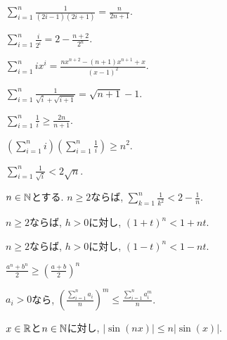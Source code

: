 \begin{prop}
  $\sum_{i=1}^n\frac{1}{(2i-1)(2i+1)}=\frac{n}{2n+1}$.
\end{prop}

\begin{prop}
  $\sum_{i=1}^n\frac{i}{2^i}=2-\frac{n+2}{2^n}$.
\end{prop}

\begin{prop}
  $\sum_{i=1}^n ix^i=\frac{nx^{n+2}-(n+1)x^{n+1}+x}{(x-1)^2}$.
\end{prop}

\begin{prop}
  $\sum_{i=1}^n \frac{1}{\sqrt{i}+\sqrt{i+1}}=\sqrt{n+1}-1$.
\end{prop}

\begin{prop}
$\sum_{i=1}^{n}\frac{1}{i}\geq \frac{2n}{n+1}$.
\end{prop}

\begin{prop}
$\left(\sum_{i=1}^{n}i\right)\left(\sum_{i=1}^{n}\frac{1}{i}\right)\geq n^2$.
\end{prop}

\begin{prop}
$\sum_{i=1}^{n}\frac{1}{\sqrt{i}}<2\sqrt{n}$.
\end{prop}

\begin{prop}
$n\in\mathbb{N}$とする.
  $n\geq 2$ならば, $\sum_{k=1}^n\frac{1}{k^2} < 2-\frac{1}{n}$.
\end{prop}

\begin{prop}
  $n\geq 2$ならば,  $h>0$に対し,
$(1+t)^n<1+nt$.
\end{prop}
\begin{prop}
  $n\geq 2$ならば,  $h>0$に対し,
$(1-t)^n<1-nt$.
\end{prop}

\begin{prop}
$\frac{a^n+b^n}{2}\geq \left(\frac{a+b}{2}\right)^n$
\end{prop}

\begin{prop}
  $a_i>0$なら,
  $\left(\frac{\sum_{i=1}^n a_i}{n}\right)^m \leq \frac{\sum_{i=1}^{n}a_i^m}{n}$.
\end{prop}

\begin{prop}
$x\in\mathbb{R}$と$n\in\mathbb{N}$に対し, $|\sin(nx)|\leq n|\sin(x)|$.
\end{prop}

